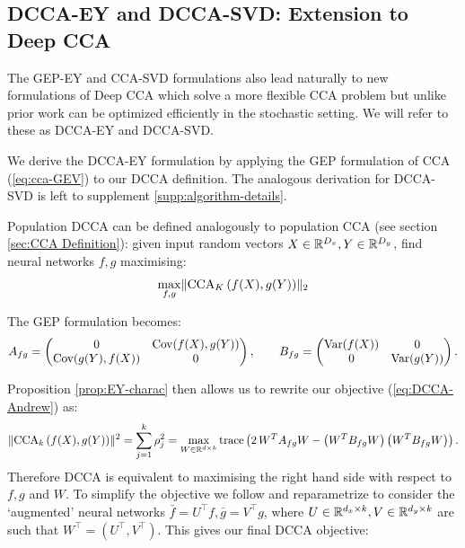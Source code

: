 \subsection{DCCA-EY and DCCA-SVD: Extension to Deep CCA}\label{sec:deep-cca}
The GEP-EY and CCA-SVD formulations also lead naturally to new formulations of Deep CCA which solve a more flexible CCA problem but unlike prior work can be optimized efficiently in the stochastic setting. We will refer to these as DCCA-EY and DCCA-SVD.

We derive the DCCA-EY formulation by applying the GEP formulation of CCA (\ref{eq:cca-GEV}) to our DCCA definition. The analogous derivation for DCCA-SVD is left to supplement \ref{supp:algorithm-details}. 

Population DCCA \cite{andrew2013deep} can be defined analogously to population CCA (see section \ref{sec:CCA Definition}):
given input random vectors $X \in \mathbb{R}^{D_x}, Y \in \mathbb{R}^{D_y}$, find neural networks $f,g$ maximising:
\begin{align}\label{eq:DCCA-Andrew}
    \max_{f,g}  \lVert\operatorname{CCA}_K\left(f(X),g(Y)\right)\rVert_2
\end{align}

The GEP formulation becomes:
\begin{equation*}
    A_{fg} = \begin{pmatrix} 0 &\mathrm{Cov}(f(X),g(Y)) \\ \mathrm{Cov}(g(Y),f(X)) & 0 \end{pmatrix}, \qquad
	B_{fg} = \begin{pmatrix}\mathrm{Var}(f(X)) & 0 \\ 0 & \mathrm{Var}(g(Y)) \end{pmatrix}.
\end{equation*}

Proposition \ref{prop:EY-charac} then allows us to rewrite our objective (\ref{eq:DCCA-Andrew}) as:
\begin{align*}
    \lVert\operatorname{CCA}_k\left(f(X),g(Y)\right)\rVert^2 
    = \sum_{j=1}^k \rho_j^2 
    = \max_{W \in \mathbb{R}^{d \times k}} \operatorname{trace} \left( 2\, W^T A_{fg} W - \left(W^T B_{fg} W\right) \left(W^T B_{fg} W\right) \right).
\end{align*}
Therefore DCCA is equivalent to maximising the right hand side with respect to $f,g$ and $W$. To simplify the objective we follow \cite{wang2015stochastic} and reparametrize to consider the `augmented' neural networks $\bar{f} = U^{\top} f, \bar{g} = V^{\top} g$, where $U\in \mathbb{R}^{d_x \times k}, V\in \mathbb{R}^{d_y \times k}$ are such that $W^{\top} = (U^{\top}, V^{\top})$. This gives our final DCCA objective:


